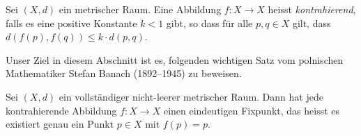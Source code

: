 \documentclass[../main.tex]{subfiles}
\begin{document}
\begin{definition}
  Sei $(X, d)$ ein metrischer Raum.
  Eine Abbildung $f \colon X \to X$ heisst \emph{kontrahierend},
  falls es eine positive Konstante $k < 1$ gibt,
  so dass für alle $p, q \in X$ gilt,
  dass $d(f(p), f(q)) \leq k \cdot d(p, q)$.
\end{definition}

Unser Ziel in diesem Abschnitt ist es,
folgenden wichtigen Satz vom polnischen
Mathematiker Stefan Banach (1892--1945)
zu beweisen.

\begin{theorem*}
  Sei $(X, d)$ ein vollständiger nicht-leerer metrischer Raum.
  Dann hat jede kontrahierende Abbildung
  $f \colon X \to X$ einen eindeutigen Fixpunkt,
  das heisst es existiert genau ein Punkt $p \in X$ 
  mit $f(p) = p$.
\end{theorem*}
\end{document}
